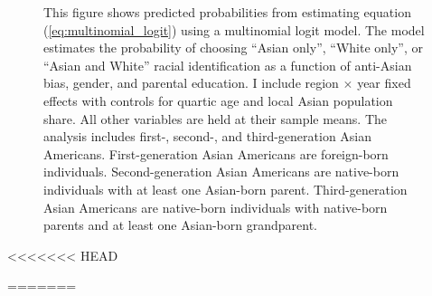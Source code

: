 \begin{center}
\begin{figure}[!htb]
\caption*{\footnotesize{This figure shows predicted probabilities from estimating equation (\ref{eq:multinomial_logit}) using a multinomial logit model. The model estimates the probability of choosing ``Asian only'', ``White only'', or ``Asian and White'' racial identification as a function of anti-Asian bias, gender, and parental education. I include region $\times$ year fixed effects with controls for quartic age and local Asian population share. All other variables are held at their sample means. The analysis includes first-, second-, and third-generation Asian Americans. First-generation Asian Americans are foreign-born individuals. Second-generation Asian Americans are native-born individuals with at least one Asian-born parent. Third-generation Asian Americans are native-born individuals with native-born parents and at least one Asian-born grandparent.}}
\end{figure}
\end{center}

<<<<<<< HEAD

=======
\pagebreak
\newpage

